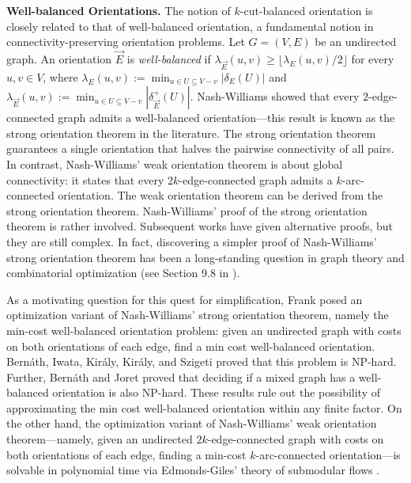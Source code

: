 \documentclass[11pt]{article}
\begin{document}
\vspace{1mm}
\noindent \textbf{Well-balanced Orientations.}
The notion of $k$-cut-balanced orientation is closely related to that of well-balanced orientation, a fundamental notion in connectivity-preserving orientation problems. Let $G=(V, E)$ be an undirected graph. An orientation $\vec{E}$ is \emph{well-balanced} if $\lambda_{\vec{E}}(u,v)\ge \lfloor \lambda_E(u,v)/2\rfloor$ for every $u,v\in V$, where 
$\lambda_E(u,v):=\min_{u\in U\subseteq V-v}|\delta_E(U)|$ and 
$\lambda_{\vec{E}}(u,v):=\min_{u\in U\subseteq V-v}|\delta_{\vec{E}}^+(U)|$. 
Nash-Williams \cite{nash1960orientations} showed that every $2$-edge-connected graph admits a well-balanced orientation---this result is known as the strong orientation theorem in the literature. The strong orientation theorem guarantees a single orientation that halves the pairwise connectivity of all pairs. In contrast, Nash-Williams' weak orientation theorem is about global connectivity: it states that every $2k$-edge-connected graph admits a $k$-arc-connected orientation. The weak orientation theorem can be derived from the strong orientation theorem. Nash-Williams' proof of the strong orientation theorem is rather involved. Subsequent works \cite{mader1978reduction,frank1993applications} have given alternative proofs, but they are still complex. In fact, discovering a simpler proof of Nash-Williams' strong orientation theorem has been a long-standing question in graph theory and combinatorial optimization (see Section 9.8 in \cite{frank2011connections}). 

As a motivating question for this quest for simplification, Frank \cite{frank1993applications} posed an optimization variant of Nash-Williams' strong orientation theorem, namely the min-cost well-balanced orientation problem: given an undirected graph with costs on both orientations of each edge, find a min cost well-balanced orientation. Bern\'ath, Iwata, Kir\'{a}ly, Kir\'{a}ly, and Szigeti \cite{bernath2008recent} proved that this problem is NP-hard. Further, Bern\'ath and Joret \cite{bernath2008well} proved that deciding if a mixed graph has a well-balanced orientation is also NP-hard. These results rule out the possibility of approximating the min cost well-balanced orientation within any finite factor. On the other hand, the optimization variant of Nash-Williams' weak orientation theorem---namely, given an undirected $2k$-edge-connected graph with costs on both orientations of each edge, finding a min-cost $k$-arc-connected orientation---is solvable in polynomial time via Edmonds-Giles' theory of submodular flows \cite{edmonds1977min}. 
\end{document}
